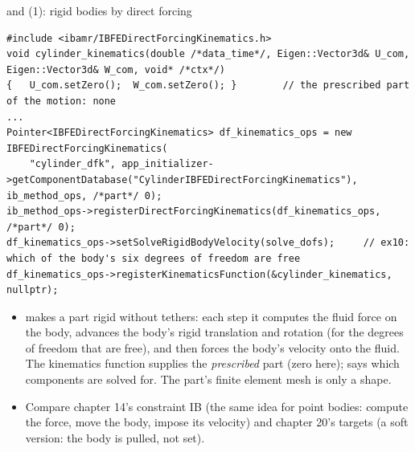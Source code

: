 \documentclass[aspectratio=169,11pt]{beamer}
\begin{document}
\begin{frame}[fragile]{ and  (1): rigid bodies by direct forcing}
\label{fr:ex1011}
\footnotesize
\begin{lstlisting}[style=cpptiny]
#include <ibamr/IBFEDirectForcingKinematics.h>
void cylinder_kinematics(double /*data_time*/, Eigen::Vector3d& U_com, Eigen::Vector3d& W_com, void* /*ctx*/)
{   U_com.setZero();  W_com.setZero(); }        // the prescribed part of the motion: none
...
Pointer<IBFEDirectForcingKinematics> df_kinematics_ops = new IBFEDirectForcingKinematics(
    "cylinder_dfk", app_initializer->getComponentDatabase("CylinderIBFEDirectForcingKinematics"), ib_method_ops, /*part*/ 0);
ib_method_ops->registerDirectForcingKinematics(df_kinematics_ops, /*part*/ 0);
df_kinematics_ops->setSolveRigidBodyVelocity(solve_dofs);     // ex10: which of the body's six degrees of freedom are free
df_kinematics_ops->registerKinematicsFunction(&cylinder_kinematics, nullptr);
\end{lstlisting}
\begin{itemize}
  \item {}  makes a part rigid without tethers: each step it computes the fluid force on the body, advances the body's rigid translation and rotation (for the degrees of freedom that are free), and then forces the body's velocity onto the fluid. The kinematics function supplies the \emph{prescribed} part (zero here);  says which components are solved for. The part's finite element mesh is only a shape.
  \item Compare chapter 14's constraint IB (the same idea for point bodies: compute the force, move the body, impose its velocity) and chapter 20's targets (a soft version: the body is pulled, not set).
\end{itemize}
\end{frame}
\end{document}
